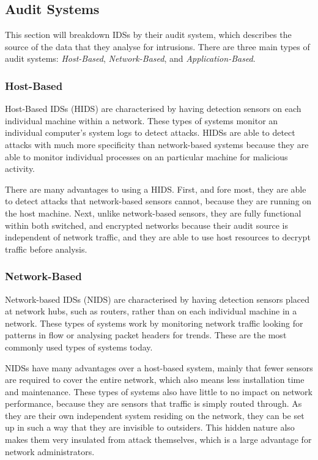 \documentclass{acm_proc_article-sp}
\begin{document}
    \subsection{Audit Systems}
    	This section will breakdown IDSs by their audit system, which describes the source of the data that they analyse for intrusions. There are three main types of audit systems: \emph{Host-Based}, \emph{Network-Based}, and \emph{Application-Based}.
    	\subsubsection{Host-Based}
    		Host-Based IDSs (HIDS) are characterised by having detection sensors on each individual machine within a network. These types of systems monitor an individual computer's system logs to detect attacks. HIDSs are able to detect attacks with much more specificity than network-based systems because they are able to monitor individual processes on an particular machine for malicious activity. 
    		
    		There are many advantages to using a HIDS. First, and fore most, they are able to detect attacks that network-based sensors cannot, because they are running on the host machine. Next, unlike network-based sensors, they are fully functional within both switched, and encrypted networks because their audit source is independent of network traffic, and they are able to use host resources to decrypt traffic before analysis.
    	\subsubsection{Network-Based}
    		Network-based IDSs (NIDS) are characterised by having detection sensors placed at network hubs, such as routers, rather than on each individual machine in a network. These types of systems work by monitoring network traffic looking for patterns in flow or analysing packet headers for trends. These are the most commonly used types of systems today. 
    		
    		NIDSs have many advantages over a host-based system, mainly that fewer sensors are required to cover the entire network, which also means less installation time and maintenance. These types of systems also have little to no impact on network performance, because they are sensors that traffic is simply routed through. As they are their own independent system residing on the network, they can be set up in such a way that they are invisible to outsiders. This hidden nature also makes them very insulated from attack themselves, which is a large advantage for network administrators. 
    		
\end{document}

